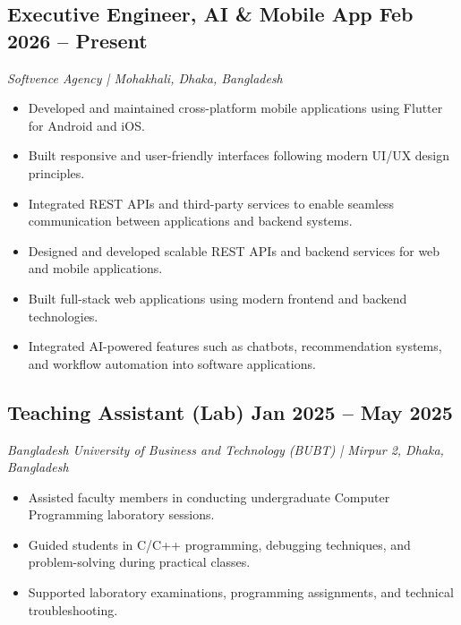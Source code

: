 \subsection{{Executive Engineer, AI \& Mobile App \hfill Feb 2026 -- Present}}

\textit{Softvence Agency | Mohakhali, Dhaka, Bangladesh}

\begin{itemize}

    \item Developed and maintained cross-platform mobile applications using Flutter for Android and iOS.

    \item Built responsive and user-friendly interfaces following modern UI/UX design principles.

    \item Integrated REST APIs and third-party services to enable seamless communication between applications and backend systems.

    \item Designed and developed scalable REST APIs and backend services for web and mobile applications.

    \item Built full-stack web applications using modern frontend and backend technologies.

    \item Integrated AI-powered features such as chatbots, recommendation systems, and workflow automation into software applications.

\end{itemize}


\subsection{{Teaching Assistant (Lab) \hfill Jan 2025 -- May 2025}}

\textit{Bangladesh University of Business and Technology (BUBT) | Mirpur 2, Dhaka, Bangladesh}

\begin{itemize}
    \item Assisted faculty members in conducting undergraduate Computer Programming laboratory sessions.
    
    \item Guided students in C/C++ programming, debugging techniques, and problem-solving during practical classes.
    
    \item Supported laboratory examinations, programming assignments, and technical troubleshooting.
\end{itemize}